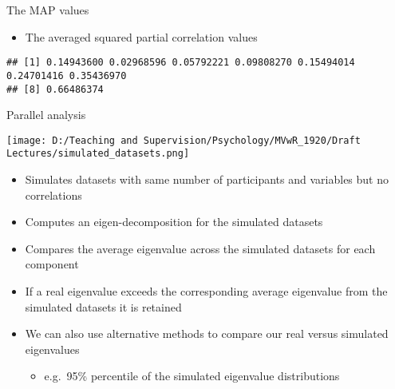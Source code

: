 \documentclass[
  ignorenonframetext,
]{beamer}
\newenvironment{Shaded}{\begin{snugshade}}{\end{snugshade}}
\newcommand{\NormalTok}[1]{#1}
\newcommand{\OperatorTok}[1]{\textcolor[rgb]{0.81,0.36,0.00}{\textbf{#1}}}
\providecommand{\tightlist}{%
  \setlength{\itemsep}{0pt}\setlength{\parskip}{0pt}}
\begin{document}
\begin{frame}[fragile]{The MAP values}
\protect\hypertarget{the-map-values}{}

\begin{itemize}
\tightlist
\item
  The averaged squared partial correlation values
\end{itemize}

\begin{Shaded}
\end{Shaded}

\begin{verbatim}
## [1] 0.14943600 0.02968596 0.05792221 0.09808270 0.15494014 0.24701416 0.35436970
## [8] 0.66486374
\end{verbatim}

\end{frame}

\begin{frame}{Parallel analysis}
\protect\hypertarget{parallel-analysis}{}

\texttt{[image: D:/Teaching and Supervision/Psychology/MVwR\_1920/Draft Lectures/simulated\_datasets.png]}

\begin{itemize}
\tightlist
\item
  Simulates datasets with same number of participants and variables but
  no correlations
\item
  Computes an eigen-decomposition for the simulated datasets
\item
  Compares the average eigenvalue across the simulated datasets for each
  component
\item
  If a real eigenvalue exceeds the corresponding average eigenvalue from
  the simulated datasets it is retained
\item
  We can also use alternative methods to compare our real versus
  simulated eigenvalues

  \begin{itemize}
  \tightlist
  \item
    e.g.~95\% percentile of the simulated eigenvalue distributions
  \end{itemize}
\end{itemize}

\end{frame}
\end{document}
